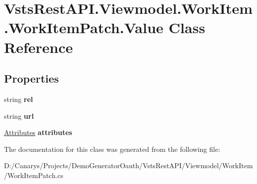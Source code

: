 \hypertarget{class_vsts_rest_a_p_i_1_1_viewmodel_1_1_work_item_1_1_work_item_patch_1_1_value}{}\section{Vsts\+Rest\+A\+P\+I.\+Viewmodel.\+Work\+Item.\+Work\+Item\+Patch.\+Value Class Reference}
\label{class_vsts_rest_a_p_i_1_1_viewmodel_1_1_work_item_1_1_work_item_patch_1_1_value}
\subsection*{Properties}
\begin{DoxyCompactItemize}
\item 
\mbox{\label{class_vsts_rest_a_p_i_1_1_viewmodel_1_1_work_item_1_1_work_item_patch_1_1_value_a60193a1ddcce4e012fc8065062996af4}} 
string {\bfseries rel}
\item 
\mbox{\label{class_vsts_rest_a_p_i_1_1_viewmodel_1_1_work_item_1_1_work_item_patch_1_1_value_acb0e41224a9c01cc2ddbf327cab8ad18}} 
string {\bfseries url}
\item 
\mbox{\label{class_vsts_rest_a_p_i_1_1_viewmodel_1_1_work_item_1_1_work_item_patch_1_1_value_a6a7c2edadb18597e58b66fef476dfba6}} 
\mbox{\hyperlink{class_vsts_rest_a_p_i_1_1_viewmodel_1_1_work_item_1_1_work_item_patch_1_1_attributes}{Attributes}} {\bfseries attributes}
\end{DoxyCompactItemize}


The documentation for this class was generated from the following file\+:\begin{DoxyCompactItemize}
\item 
D\+:/\+Canarys/\+Projects/\+Demo\+Generator\+Oauth/\+Vsts\+Rest\+A\+P\+I/\+Viewmodel/\+Work\+Item/Work\+Item\+Patch.\+cs\end{DoxyCompactItemize}
